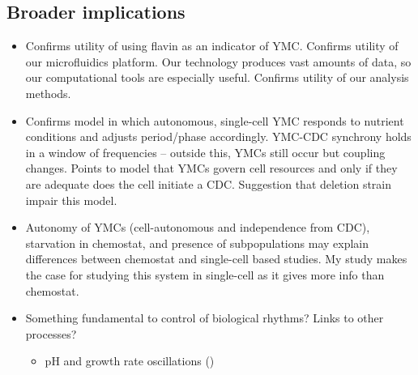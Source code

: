 \subsection{Broader implications}
\label{sec:biology-discussion-implications}

\begin{itemize}
\item Confirms utility of using flavin as an indicator of YMC.  Confirms utility of our microfluidics platform.  Our technology produces vast amounts of data, so our computational tools are especially useful.  Confirms utility of our analysis methods.
\item Confirms model in which autonomous, single-cell YMC responds to nutrient conditions and adjusts period/phase accordingly.  YMC-CDC synchrony holds in a window of frequencies -- outside this, YMCs still occur but coupling changes.  Points to model that YMCs govern cell resources and only if they are adequate does the cell initiate a CDC.  Suggestion that deletion strain impair this model.
\item Autonomy of YMCs (cell-autonomous and independence from CDC), starvation in chemostat, and presence of subpopulations may explain differences between chemostat and single-cell based studies.  My study makes the case for studying this system in single-cell as it gives more info than chemostat.
\item Something fundamental to control of biological rhythms?  Links to other processes?
\begin{itemize}
\item pH and growth rate oscillations (\cite{luziaPHDependenciesGlycolytic})
\end{itemize}
\end{itemize}
